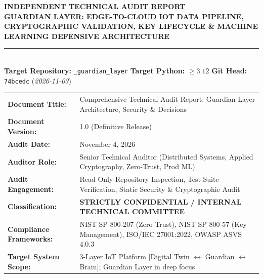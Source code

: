 \documentclass[10pt,a4paper]{report}
\begin{document}
\begin{titlepage}
\begin{center}
\vspace*{1cm}
{\huge \textbf{\textsf{INDEPENDENT TECHNICAL AUDIT REPORT}}}\\[0.6cm]
{\Large \textbf{\textsf{GUARDIAN LAYER: EDGE-TO-CLOUD IOT DATA PIPELINE, CRYPTOGRAPHIC VALIDATION, KEY LIFECYCLE \& MACHINE LEARNING DEFENSIVE ARCHITECTURE}}}\\[0.4cm]
\rule{\linewidth}{1.5pt}\\[0.4cm]
{\large \textsf{\textbf{Target Repository:} \texttt{_guardian\_layer} \quad \textbar \quad \textbf{Target Python:} $\ge 3.12$ \quad \textbar \quad \textbf{Git Head:} \texttt{74bcedc} (\textit{2026-11-03})}}\\[0.8cm]

\begin{tcolorbox}[colback=blue!5!white,colframe=blue!75!black,title=\textbf{Document Control \& Metadata},arc=2mm]
\begin{tabularx}{\textwidth}{lX}
\textbf{Document Title:} & Comprehensive Technical Audit Report: Guardian Layer Architecture, Security \& Decisions \\
\textbf{Document Version:} & 1.0 (Definitive Release) \\
\textbf{Audit Date:} & November 4, 2026 \\
\textbf{Auditor Role:} & Senior Technical Auditor (Distributed Systems, Applied Cryptography, Zero-Trust, Prod ML) \\
\textbf{Audit Engagement:} & Read-Only Repository Inspection, Test Suite Verification, Static Security \& Cryptographic Audit \\
\textbf{Classification:} & \textbf{STRICTLY CONFIDENTIAL / INTERNAL TECHNICAL COMMITTEE} \\
\textbf{Compliance Frameworks:} & NIST SP 800-207 (Zero Trust), NIST SP 800-57 (Key Management), ISO/IEC 27001:2022, OWASP ASVS 4.0.3 \\
\textbf{Target System Scope:} & 3-Layer IoT Platform [Digital Twin $\leftrightarrow$ Guardian $\leftrightarrow$ Brain]; Guardian Layer in deep focus \\
\end{tabularx}
\end{tcolorbox}

\vfill


\end{center}
\end{titlepage}
\end{document}
